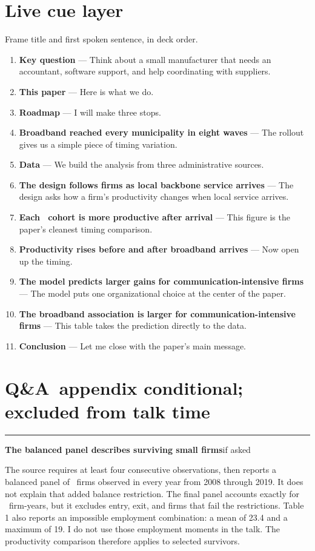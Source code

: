 \documentclass[11pt]{article}
\newcommand{\scriptframe}[3]{%
  \Needspace{11\baselineskip}%
  \par\medskip\noindent\textcolor{ScriptBlue}{\rule{\linewidth}{0.55pt}}%
  \par\smallskip\noindent
  \textbf{#1}\hfill\textcolor{ScriptGray}{\small #2}\par\smallskip
  #3\par}
\newcommand{\ScriptAppendix}{%
  \clearpage
  \section*{\mbox{Q\&A appendix} \hfill
    \normalfont\small\textcolor{ScriptGray}{conditional; excluded from talk time}}}
\begin{document}
\section*{Live cue layer}
\textcolor{ScriptGray}{Frame title and first spoken sentence, in deck order.}
\raggedright\small
\begin{enumerate}\setlength{\itemsep}{0.55em}\setlength{\topsep}{0.50em}
  \item \textbf{Key question} --- Think about a small manufacturer that needs an accountant, software support, and help coordinating with suppliers.
  \item \textbf{This paper} --- Here is what we do.
  \item \textbf{Roadmap} --- I will make three stops.
  \item \textbf{Broadband reached every municipality in eight waves} --- The rollout gives us a simple piece of timing variation.
  \item \textbf{Data} --- We build the analysis from three administrative sources.
  \item \textbf{The design follows firms as local backbone service arrives} --- The design asks how a firm's productivity changes when local service arrives.
  \item \textbf{Each \ResCohortYears\ cohort is more productive after arrival} --- This figure is the paper's cleanest timing comparison.
  \item \textbf{Productivity rises before and after broadband arrives} --- Now open up the timing.
  \item \textbf{The model predicts larger gains for communication-intensive firms} --- The model puts one organizational choice at the center of the paper.
  \item \textbf{The broadband association is larger for communication-intensive firms} --- This table takes the prediction directly to the data.
  \item \textbf{Conclusion} --- Let me close with the paper's main message.
\end{enumerate}
\normalsize

\ScriptAppendix

\scriptframe{The balanced panel describes surviving small firms}{if asked}{%
  The source requires at least four consecutive observations, then reports
  a balanced panel of \ResFirms\ firms observed in every year from 2008 through
  2019. It does not explain that added balance restriction. The final panel
  accounts exactly for \ResFirmYears\ firm-years, but it excludes
  entry, exit, and firms that fail the restrictions. Table 1 also reports an impossible
  employment combination: a mean of 23.4 and a maximum of 19. I do not use
  those employment moments in the talk. The productivity comparison therefore
  applies to selected survivors.
}
\end{document}
